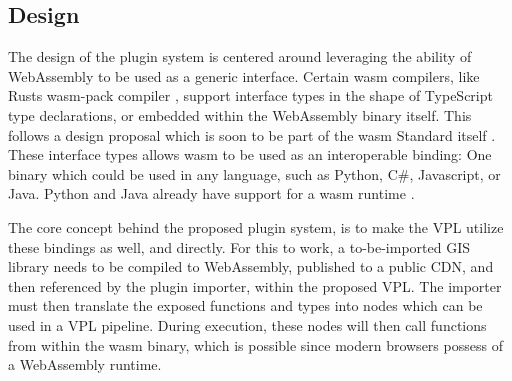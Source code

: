 \subsection{Design}

The design of the plugin system is centered around leveraging the ability of WebAssembly to be used as a generic interface. 
Certain \ac{wasm} compilers, like Rusts wasm-pack compiler \citep*{contributors_wasm-pack_2022}, support interface types in the shape of TypeScript type declarations, or embedded within the WebAssembly binary itself. 
This follows a design proposal which is soon to be part of the \ac{wasm} Standard itself \citep*{wagner_interface_2022}.
These interface types allows \ac{wasm} to be used as an interoperable binding: One binary which could be used in any language, such as Python, C\#, Javascript, or Java. 
Python and Java already have support for a \ac{wasm} runtime \citep*{clark_webassembly_2019}. 

The core concept behind the proposed plugin system, is to make the VPL utilize these bindings as well, and directly.  
For this to work, a to-be-imported GIS library needs to be compiled to WebAssembly, published to a public \ac{CDN}, and then referenced by the plugin importer, within the proposed VPL. 
The importer must then translate the exposed functions and types into nodes which can be used in a VPL pipeline. 
During execution, these nodes will then call functions from within the \ac{wasm} binary, which is possible since modern browsers possess of a WebAssembly runtime.

